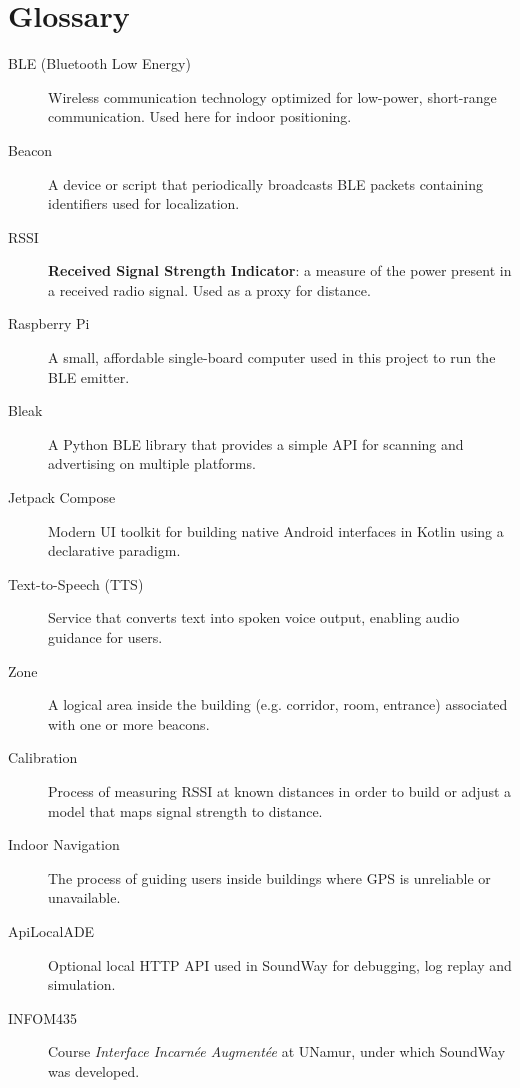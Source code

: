 \documentclass[12pt,a4paper]{article}
\begin{document}
\pagebreak

\section{Glossary}

\begin{description}
    \item[BLE (Bluetooth Low Energy)] Wireless communication technology optimized for low-power, short-range communication. Used here for indoor positioning.

    \item[Beacon] A device or script that periodically broadcasts BLE packets containing identifiers used for localization.

    \item[RSSI] \textbf{Received Signal Strength Indicator}: a measure of the power present in a received radio signal. Used as a proxy for distance.

    \item[Raspberry Pi] A small, affordable single-board computer used in this project to run the BLE emitter.

    \item[Bleak] A Python BLE library that provides a simple API for scanning and advertising on multiple platforms.

    \item[Jetpack Compose] Modern UI toolkit for building native Android interfaces in Kotlin using a declarative paradigm.

    \item[Text-to-Speech (TTS)] Service that converts text into spoken voice output, enabling audio guidance for users.

    \item[Zone] A logical area inside the building (e.g. corridor, room, entrance) associated with one or more beacons.

    \item[Calibration] Process of measuring RSSI at known distances in order to build or adjust a model that maps signal strength to distance.

    \item[Indoor Navigation] The process of guiding users inside buildings where GPS is unreliable or unavailable.

    \item[ApiLocalADE] Optional local HTTP API used in SoundWay for debugging, log replay and simulation.

    \item[INFOM435] Course \textit{Interface Incarnée Augmentée} at UNamur, under which SoundWay was developed.
\end{description}
\end{document}
